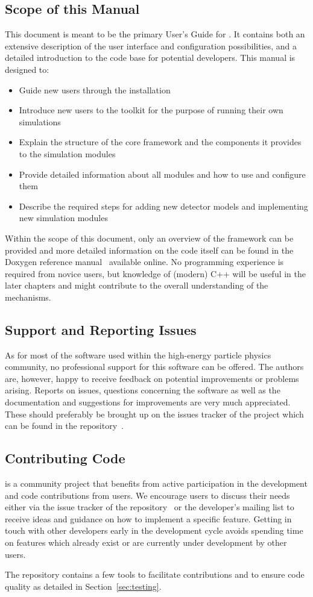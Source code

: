 \subsection{Scope of this Manual}
This document is meant to be the primary User's Guide for \apsq.
It contains both an extensive description of the user interface and configuration possibilities, and a detailed introduction to the code base for potential developers.
This manual is designed to:
\begin{itemize}
\item Guide new users through the installation
\item Introduce new users to the toolkit for the purpose of running their own simulations
\item Explain the structure of the core framework and the components it provides to the simulation modules
\item Provide detailed information about all modules and how to use and configure them
\item Describe the required steps for adding new detector models and implementing new simulation modules
\end{itemize}

Within the scope of this document, only an overview of the framework can be provided and more detailed information on the code itself can be found in the Doxygen reference manual~\cite{ap2-doxygen} available online.
No programming experience is required from novice users, but knowledge of (modern) C++ will be useful in the later chapters and might contribute to the overall understanding of the mechanisms.

\subsection{Support and Reporting Issues}
As for most of the software used within the high-energy particle physics community, no professional support for this software can be offered.
The authors are, however, happy to receive feedback on potential improvements or problems arising.
Reports on issues, questions concerning the software as well as the documentation and suggestions for improvements are very much appreciated.
These should preferably be brought up on the issues tracker of the project which can be found in the repository~\cite{ap2-issue-tracker}.


\subsection{Contributing Code}
\apsq is a community project that benefits from active participation in the development and code contributions from users.
We encourage users to discuss their needs either via the issue tracker of the repository~\cite{ap2-issue-tracker} or the developer's mailing list to receive ideas and guidance on how to implement a specific feature.
Getting in touch with other developers early in the development cycle avoids spending time on features which already exist or are currently under development by other users.

The repository contains a few tools to facilitate contributions and to ensure code quality as detailed in Section~\ref{sec:testing}.
